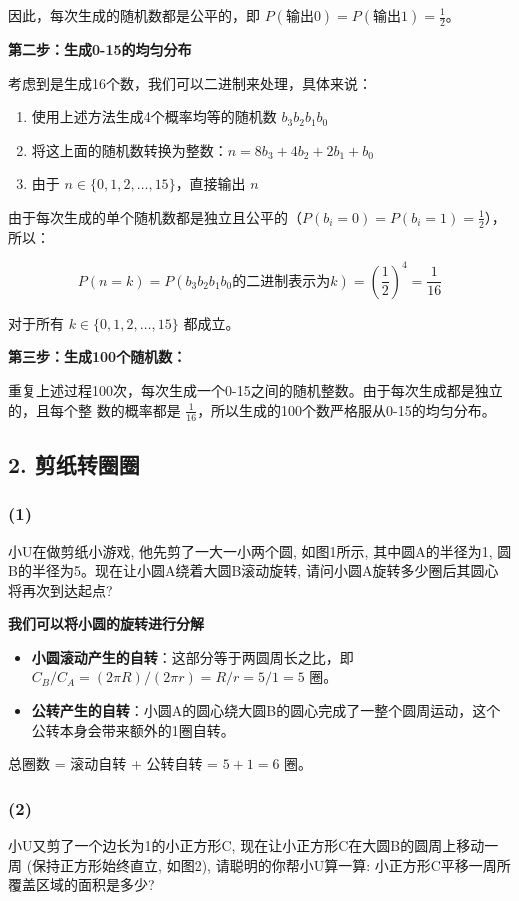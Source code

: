 \documentclass[UTF8]{ctexart}
\begin{document}
因此，每次生成的随机数都是公平的，即 $P(\text{输出0}) = P(\text{输出1}) =
\frac{1}{2}$。

\textbf{第二步：生成0-15的均匀分布}

考虑到是生成16个数，我们可以二进制来处理，具体来说：
\begin{enumerate}
    \item 使用上述方法生成4个概率均等的随机数 $b_3b_2b_1b_0$
    \item 将这上面的随机数转换为整数：$n = 8b_3 + 4b_2 + 2b_1 + b_0$
    \item 由于 $n \in \{0,1,2,\ldots,15\}$，直接输出 $n$
\end{enumerate}


由于每次生成的单个随机数都是独立且公平的（$P(b_i = 0) = P(b_i = 1) = \frac{1}{2}$），所以：

$$P(n = k) = P(b_3b_2b_1b_0 \text{的二进制表示为} k) = \left(\frac{1}{2}\right)^4 =
\frac{1}{16}$$

对于所有 $k \in \{0,1,2,\ldots,15\}$ 都成立。

\textbf{第三步：生成100个随机数：}

重复上述过程100次，每次生成一个0-15之间的随机整数。由于每次生成都是独立的，且每个整
数的概率都是 $\frac{1}{16}$，所以生成的100个数严格服从0-15的均匀分布。

\subsection*{2. 剪纸转圈圈}
\subsubsection*{(1)}
小U在做剪纸小游戏, 他先剪了一大一小两个圆, 如图1所示, 其中圆A的半径为1, 圆B的半径为5。现在让小圆A绕着大圆B滚动旋转, 请问小圆A旋转多少圈后其圆心将再次到达起点?

\textbf{我们可以将小圆的旋转进行分解}
\begin{itemize}
    \item \textbf{小圆滚动产生的自转}：这部分等于两圆周长之比，即 $C_B / C_A = (2\pi R)/(2\pi r) = R/r = 5/1 = 5$ 圈。 
    \item \textbf{公转产生的自转}：小圆A的圆心绕大圆B的圆心完成了一整个圆周运动，这个公转本身会带来额外的1圈自转。
\end{itemize}
总圈数 = 滚动自转 + 公转自转 = $5 + 1 = 6$ 圈。
\subsubsection*{(2)}
小U又剪了一个边长为1的小正方形C, 现在让小正方形C在大圆B的圆周上移动一周 (保持正方形始终直立, 如图2), 请聪明的你帮小U算一算: 小正方形C平移一周所覆盖区域的面积是多少?
\end{document}
